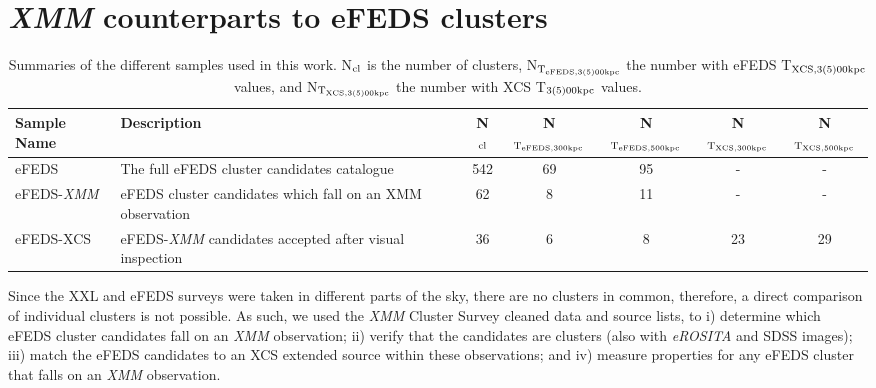 \documentclass[fleqn,usenatbib]{mnras}
\begin{document}
\section{{\em XMM} counterparts to \lowercase{e}FEDS clusters}
\label{sec:efedsxmm}

\begin{table}
\begin{center}
\caption[]{{Summaries of the different samples used in this work. N$_{\rm{cl}}$ is the number of clusters, N$_{\rm{T}_{\rm{eFEDS, 3(5)00kpc}}}$ the number with eFEDS T$_{\rm{XCS, 3(5)00kpc}}$ values, and N$_{\rm{T}_{\rm{XCS, 3(5)00kpc}}}$ the number with XCS T$_{\rm{3(5)00kpc}}$ values.}\label{tab:samples}}
\vspace{1mm}
\begin{tabular}{l|lccccc}
\hline
\hline
Sample Name & Description & N$_{\rm{cl}}$ & N$_{\rm{T}_{\rm{eFEDS, 300kpc}}}$ & N$_{\rm{T}_{\rm{eFEDS, 500kpc}}}$ & N$_{\rm{T}_{\rm{XCS, 300kpc}}}$ & N$_{\rm{T}_{\rm{XCS, 500kpc}}}$\\
\hline
\hline
eFEDS & The full eFEDS cluster candidates catalogue & 542 & 69 & 95 & - & - \\
\hline
eFEDS-{\em XMM} & eFEDS cluster candidates which fall on an XMM observation & 62 & 8 & 11 & - & - \\
\hline
eFEDS-XCS & eFEDS-{\em XMM} candidates accepted after visual inspection & 36 & 6 & 8 & 23 & 29 \\
\hline
\end{tabular}
\end{center}
\end{table}

Since the XXL and eFEDS surveys were taken in different parts of the sky, there are no clusters in common, therefore, a direct comparison of individual clusters is not possible. As such, we used the {\em XMM} Cluster Survey \citep[XCS, ][]{xcsfoundation} cleaned data and source lists, to i) determine which eFEDS cluster candidates fall on an {\em XMM} observation; ii) verify that the candidates are clusters (also with {\em eROSITA} and SDSS images); iii) match the eFEDS candidates to an XCS extended source within these observations; and iv) measure properties for any eFEDS cluster that falls on an {\em XMM} observation.
\end{document}
